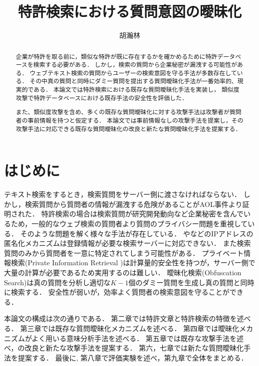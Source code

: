 \documentclass[master]{suribt}
\title{特許検索における質問意図の曖昧化}
\author{胡瀚林}
\theoremstyle{definition}
\begin{document}
\maketitle%

\frontmatter%
\begin{abstract}%
 企業が特許を取る前に，類似な特許が既に存在するかを確かめるために特許データベースを検索する必要がある．
 しかし，検索の質問から企業秘密が漏洩する可能性がある．
 ウェブテキスト検索の質問からユーザーの検索意図を守る手法が多数存在している．
 その中真の質問と同時にダミー質問を提出する質問曖昧化手法が一番効率的、現実的である．
 本論文では特許検索における既存な質問曖昧化手法\cite{providing2009,embellishing2010,masking2014}を実装し，
 類似度攻撃\cite{simattack2016}で特許データベースにおける既存手法の安全性を評価した．

 また、類似度攻撃\cite{simattack2016}を含め、多くの既存な質問曖昧化に対する攻撃手法は攻撃者が質問者の事前情報を持つと仮定する．
 本論文では事前情報なしの攻撃手法を提案し，その攻撃手法に対応できる既存な質問曖昧化の改良と新たな質問曖昧化手法を提案する．
\end{abstract}

 \tableofcontents%

 \mainmatter%
 \chapter{はじめに}

 テキスト検索をするとき，検索質問をサーバー側に渡さなければならない．
 しかし，検索質問から質問者の情報が漏洩する危険があることがAOL事件\cite{2006}より証明された．
 特許検索の場合は検索質問が研究開発動向など企業秘密を含んでいるため，一般的なウェブ検索の質問者より質問のプライバシー問題を重視している．
 そのような問題を解く様々な手法が存在している．
 \cite{}や\cite{}などのIPアドレスの匿名化メカニズムは登録情報が必要な検索サーバーに対応できない．
 また検索質問のみから質問者を一意に特定されてしまう可能性がある\cite{2006}．
 プライベート情報検索(Private Information Retrieval )\cite{}は計算量的安全性を持つが，サーバー側で大量の計算が必要であるため実用するのは難しい．
 曖昧化検索(Obfuscation Search)\cite{}は真の質問を分析し適切な$K−1$個のダミー質問を生成し真の質問と同時に検索する．
 安全性が弱いが，効率よく質問者の検索意図を守ることができる．
 

 本論文の構成は次の通りである．
 第二章では特許文章と特許検索の特徴を述べる．
 第三章では既存な質問曖昧化メカニズム\cite{providing2009,embellishing2010,masking2014}を述べる．
 第四章では曖昧化メカニズムがよく用いる意味分析手法を述べる．
 第五章では既存な攻撃手法\cite{simattack2016}を述べ，\cite{simattack2016}の改良と新たな攻撃手法を提案する．
 第六，七章では新たな質問曖昧化手法を提案する．
 最後に, 第八章で評価実験を述べ，第九章で全体をまとめる．
\end{document}
